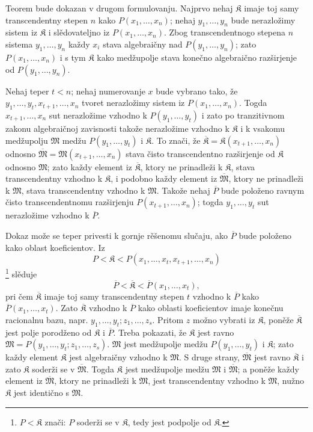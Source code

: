 \documentclass[11pt]{article}
\begin{document}
Teorem bude dokazan v drugom formulovanju. Najprvo nehaj $\mathfrak K$ imaje toj samy transcendentny stepen $n$ kako $P(x_1,\ldots,x_n)$; nehaj $y_1,\ldots,y_n$ bude nerazložimy sistem iz $\mathfrak K$ i slědovateljno iz $P(x_1,\ldots,x_n)$. Zbog transcendentnogo stepena $n$ sistema $y_1,\ldots,y_n$ každy $x_i$ stava algebraičny nad $P(y_1,\ldots,y_n)$; zato $P(x_1,\ldots,x_n)$ i s tym $\mathfrak K$ kako medžupolje stava konečno algebraično razširjenje od $P(y_1,\ldots,y_n)$.

Nehaj teper $t<n$; nehaj numerovanje $x$ bude vybrano tako, že $y_1,\ldots,y_t,x_{t+1},\ldots,x_n$ tvoret nerazložimy sistem iz $P(x_1,\ldots,x_n)$. Togda $x_{t+1},\ldots,x_n$ sut nerazložime vzhodno k $P(y_1,\ldots,y_t)$ i zato po tranzitivnom zakonu algebraičnoj zavisnosti takože nerazložime vzhodno k $\mathfrak K$ i k vsakomu medžupolju $\mathfrak M$ medžu $P(y_1,\ldots,y_t)$ i $\mathfrak K$. To znači, že $\overline{\mathfrak K}=\mathfrak K(x_{t+1},\ldots,x_n)$ odnosno $\overline{\mathfrak M}=\mathfrak M(x_{t+1},\ldots,x_n)$ stava čisto transcendentno razširjenje od $\mathfrak K$ odnosno $\mathfrak M$; zato každy element iz $\overline{\mathfrak K}$, ktory ne prinadleži k $\mathfrak K$, stava transcendentny vzhodno k $\mathfrak K$, i podobno každy element iz $\overline{\mathfrak M}$, ktory ne prinadleži k $\mathfrak M$, stava transcendentny vzhodno k $\mathfrak M$. Takože nehaj $\overline P$ bude položeno ravnym čisto transcendentnomu razširjenju $P(x_{t+1},\ldots,x_n)$; togda $y_1,\ldots,y_t$ sut nerazložime vzhodno k $\overline P$.

Dokaz može se teper privesti k gornje rěšenomu slučaju, ako $\overline P$ bude položeno kako oblast koeficientov. Iz
\[
P<\mathfrak K<P(x_1,\ldots,x_t,x_{t+1},\ldots,x_n)
\]
\footnote{$P<\mathfrak K$ znači: $P$ soderži se v $\mathfrak K$, tedy jest podpolje od $\mathfrak K$.} slěduje
\[
\overline P<\overline{\mathfrak K}<\overline P(x_1,\ldots,x_t),
\]
pri čem $\overline{\mathfrak K}$ imaje toj samy transcendentny stepen $t$ vzhodno k $\overline P$ kako $\overline P(x_1,\ldots,x_t)$. Zato $\overline{\mathfrak K}$ vzhodno k $\overline P$ kako oblasti koeficientov imaje konečnu racionalnu bazu, napr. $y_1,\ldots,y_t; z_1,\ldots,z_s$. Pritom $z$ možno vybrati iz $\mathfrak K$, poněže $\overline{\mathfrak K}$ jest polje porodženo od $\mathfrak K$ i $\overline P$. Treba pokazati, že $\mathfrak K$ jest ravno $\mathfrak M=P(y_1,\ldots,y_t;z_1,\ldots,z_s)$. $\mathfrak M$ jest medžupolje medžu $P(y_1,\ldots,y_t)$ i $\mathfrak K$; zato každy element $\mathfrak K$ jest algebraičny vzhodno k $\mathfrak M$. S druge strany, $\overline{\mathfrak M}$ jest ravno $\overline{\mathfrak K}$ i zato $\mathfrak K$ soderži se v $\overline{\mathfrak M}$. Togda $\mathfrak K$ jest medžupolje medžu $\mathfrak M$ i $\overline{\mathfrak M}$; a poněže každy element iz $\overline{\mathfrak M}$, ktory ne prinadleži k $\mathfrak M$, jest transcendentny vzhodno k $\mathfrak M$, nužno $\mathfrak K$ jest identično s $\mathfrak M$.
\end{document}
